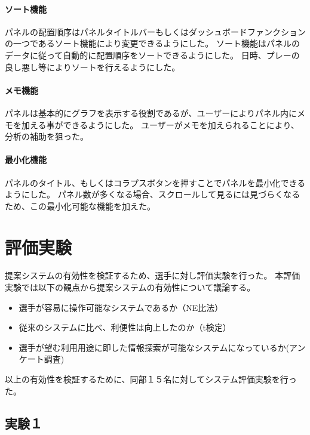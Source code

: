 \documentclass[sotsuron]{kuee}
\begin{document}
			\subsubsection{ソート機能}
			パネルの配置順序はパネルタイトルバーもしくはダッシュボードファンクションの一つであるソート機能により変更できるようにした。
			ソート機能はパネルのデータに従って自動的に配置順序をソートできるようにした。
			日時、プレーの良し悪し等によりソートを行えるようにした。
			\subsubsection{メモ機能}
			パネルは基本的にグラフを表示する役割であるが、ユーザーによりパネル内にメモを加える事ができるようにした。
			ユーザーがメモを加えられることにより、分析の補助を狙った。
			\subsubsection{最小化機能}
			パネルのタイトル、もしくはコラプスボタンを押すことでパネルを最小化できるようにした。
			パネル数が多くなる場合、スクロールして見るには見づらくなるため、この最小化可能な機能を加えた。

\chapter{評価実験}
	提案システムの有効性を検証するため、選手に対し評価実験を行った。
	本評価実験では以下の観点から提案システムの有効性について議論する。
	\begin{itemize}
		\item 選手が容易に操作可能なシステムであるか（NE比法）
		\item 従来のシステムに比べ、利便性は向上したのか（t検定）
		\item 選手が望む利用用途に即した情報探索が可能なシステムになっているか(アンケート調査)
	\end{itemize}
	以上の有効性を検証するために、同部１５名に対してシステム評価実験を行った。
	\section{実験１}
\end{document}
